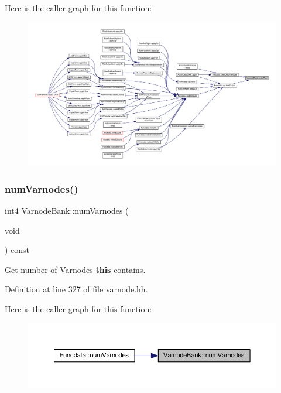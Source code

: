 Here is the caller graph for this function\+:
\nopagebreak
\begin{figure}[H]
\begin{center}
\leavevmode
\includegraphics[width=350pt]{class_varnode_bank_a8020195947e2b6faea7f18f591572c47_icgraph}
\end{center}
\end{figure}
\mbox{\label{class_varnode_bank_a312d84cc67e7a0f52cd534b1ca3d5b3c}} 
\subsubsection{\texorpdfstring{numVarnodes()}{numVarnodes()}}
{\footnotesize\ttfamily int4 Varnode\+Bank\+::num\+Varnodes (\begin{DoxyParamCaption}\item[{void}]{ }\end{DoxyParamCaption}) const\hspace{0.3cm}{\ttfamily [inline]}}



Get number of Varnodes {\bfseries{this}} contains. 



Definition at line 327 of file varnode.\+hh.

Here is the caller graph for this function\+:
\nopagebreak
\begin{figure}[H]
\begin{center}
\leavevmode
\includegraphics[width=350pt]{class_varnode_bank_a312d84cc67e7a0f52cd534b1ca3d5b3c_icgraph}
\end{center}
\end{figure}
\mbox{\label{class_varnode_bank_a9475fbf8af64f0e08f9d853791717169}} 
